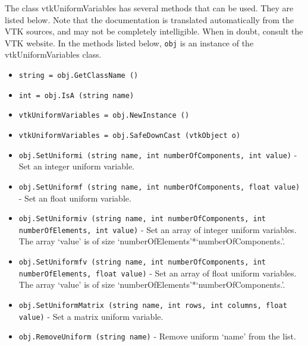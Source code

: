 The class vtkUniformVariables has several methods that can be used.
  They are listed below.
Note that the documentation is translated automatically from the VTK sources,
and may not be completely intelligible.  When in doubt, consult the VTK website.
In the methods listed below, \verb|obj| is an instance of the vtkUniformVariables class.
\begin{itemize}
\item  \verb|string = obj.GetClassName ()|

\item  \verb|int = obj.IsA (string name)|

\item  \verb|vtkUniformVariables = obj.NewInstance ()|

\item  \verb|vtkUniformVariables = obj.SafeDownCast (vtkObject o)|

\item  \verb|obj.SetUniformi (string name, int numberOfComponents, int value)| -  Set an integer uniform variable.
 
 
 

\item  \verb|obj.SetUniformf (string name, int numberOfComponents, float value)| -  Set an float uniform variable.
 
 
 

\item  \verb|obj.SetUniformiv (string name, int numberOfComponents, int numberOfElements, int value)| -  Set an array of integer uniform variables.
 The array `value' is of size `numberOfElements'*`numberOfComponents.'.
 
 
 
 

\item  \verb|obj.SetUniformfv (string name, int numberOfComponents, int numberOfElements, float value)| -  Set an array of float uniform variables.
 The array `value' is of size `numberOfElements'*`numberOfComponents.'.
 
 
 
 

\item  \verb|obj.SetUniformMatrix (string name, int rows, int columns, float value)| -  Set a matrix uniform variable.
 
 
 
 

\item  \verb|obj.RemoveUniform (string name)| -  Remove uniform `name' from the list.


\end{itemize}
